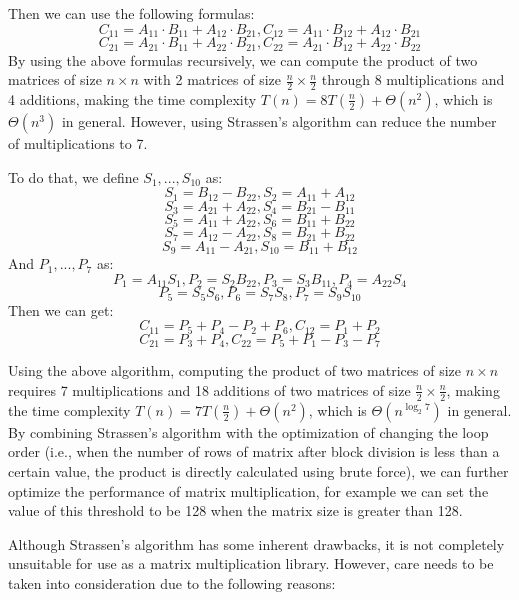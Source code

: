 \documentclass[conference]{IEEEtran}
\begin{document}
 Then we can use the following formulas:
	 $$C_{11} = A_{11} \cdot B_{11} + A_{12} \cdot B_{21}, C_{12} = A_{11} \cdot B_{12} + A_{12} \cdot B_{21}$$
	 $$C_{21} = A_{21} \cdot B_{11} + A_{22} \cdot B_{21}, C_{22} = A_{21} \cdot B_{12} + A_{22} \cdot B_{22}$$
	 By using the above formulas recursively, we can compute the product of two matrices of size $n \times n$ with 2 matrices of size $\frac{n}{2} \times \frac{n}{2}$ through 8 multiplications and 4 additions, making the time complexity $T(n) = 8 T(\frac{n}{2}) + \Theta(n^2)$, which is $\Theta(n^3)$ in general. However, using Strassen's algorithm can reduce the number of multiplications to 7.
	 
	 To do that, we define $S_1, ..., S_{10}$ as:
	 ​ $$S_1 = B_{12} - B_{22}, S_2 = A_{11} + A_{12}$$ $$S_3 = A_{21} + A_{22}, S_4 = B_{21} - B_{11}$$ $$S_5 = A_{11} + A_{22}, S_6 = B_{11} + B_{22}$$ $$S_7 = A_{12} - A_{22}, S_8 = B_{21} + B_{22}$$ $$S_9 = A_{11} - A_{21}, S_{10} = B_{11} + B_{12}$$
	 And $P_1, ..., P_{7}$ as:
	 ​ $$P_1 = A_{11}S_1, P_2 = S_2B_{22}, P_3 = S_3B_{11}, P_4 = A_{22}S_4$$ $$P_5 = S_5S_6, P_6 = S_7S_8, P_7 = S_9S_{10}$$
	 Then we can get:
	 ​ $$C_{11} = P_5 + P_4 - P_2 + P_6, C_{12} = P_1 + P_2$$ $$C_{21} = P_3 + P_4, C_{22} = P_5 + P_1 - P_3 - P_7$$
	 
	 Using the above algorithm, computing the product of two matrices of size $n \times n$ requires 7 multiplications and 18 additions of two matrices of size $\frac{n}{2} \times \frac{n}{2}$, making the time complexity $T(n) = 7 T(\frac{n}{2}) + \Theta(n^2)$, which is $\Theta(n^{\log_2 7})$ in general. By combining Strassen's algorithm with the optimization of changing the loop order (i.e., when the number of rows of matrix after block division is less than a certain value, the product is directly calculated using brute force), we can further optimize the performance of matrix multiplication, for example we can set the value of this threshold to be 128 when the matrix size is greater than 128.
	 
	 Although Strassen's algorithm has some inherent drawbacks, it is not completely unsuitable for use as a matrix multiplication library. However, care needs to be taken into consideration due to the following reasons:
	 
\end{document}
